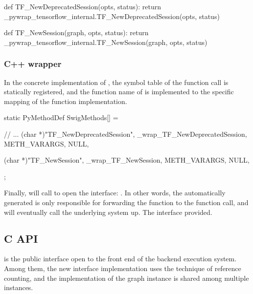 \begin{content}
\begin{leftbar}
\begin{python}[caption={tensorflow/bazel-bin/tensorflow/python/pywrap\_tensorflow\_internal.py}]
def TF_NewDeprecatedSession(opts, status):
  return _pywrap_tensorflow_internal.TF_NewDeprecatedSession(opts, status)

def TF_NewSession(graph, opts, status):
  return _pywrap_tensorflow_internal.TF_NewSession(graph, opts, status)
\end{python}
\end{leftbar}


\subsubsection{C++ wrapper}
In the concrete implementation of , the symbol table of the function call is statically registered, and the function name of  is implemented to the specific mapping of the \cpp{} function implementation.

\begin{leftbar}
\begin{c++}[caption={tensorflow/bazel-bin/tensorflow/python/pywrap\_tensorflow\_internal.cc}]
static PyMethodDef SwigMethods[] = {
  // ...
  { (char *)"TF_NewDeprecatedSession", 
    _wrap_TF_NewDeprecatedSession, METH_VARARGS, NULL},

  { (char *)"TF_NewSession", 
    _wrap_TF_NewSession, METH_VARARGS, NULL},
};
\end{c++}
\end{leftbar}

Finally,  will call  to open the  interface: . In other words, the automatically generated  is only responsible for forwarding the  function to the  function call, and will eventually call the underlying  system up. The  interface provided.


\subsection{C API}
 is the public  interface open to the front end of the  backend execution system. Among them, the new interface implementation uses the technique of reference counting, and the implementation of the graph instance is shared among multiple  instances.


\end{content}
